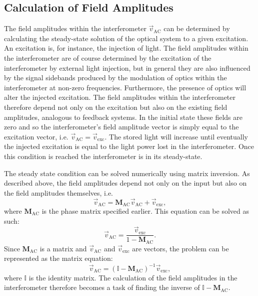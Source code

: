 \subsection{Calculation of Field Amplitudes}
The field amplitudes within the interferometer $\vec{v}_{\text{AC}}$ can be determined by calculating the steady-state solution of the optical system to a given excitation. An excitation is, for instance, the injection of light. The field amplitudes within the interferometer are of course determined by the excitation of the interferometer by external light injection, but in general they are also influenced by the signal sidebands produced by the modulation of optics within the interferometer at non-zero frequencies. Furthermore, the presence of optics will alter the injected excitation. The field amplitudes within the interferometer therefore depend not only on the excitation but also on the existing field amplitudes, analogous to feedback systems. In the initial state these fields are zero and so the interferometer's field amplitude vector is simply equal to the excitation vector, i.e. $\vec{v}_{\text{AC}} = \vec{v}_{\text{exc}}$. The stored light will increase until eventually the injected excitation is equal to the light power lost in the interferometer. Once this condition is reached the interferometer is in its steady-state.

The steady state condition can be solved numerically using matrix inversion. As described above, the field amplitudes depend not only on the input but also on the field amplitudes themselves, i.e.
\begin{equation}
  \vec{v}_{\text{AC}} = \mathbf{M}_{\text{AC}} \vec{v}_{\text{AC}} + \vec{v}_{\text{exc}},
\end{equation}
where $\mathbf{M}_{\text{AC}}$ is the phase matrix specified earlier. This equation can be solved as such:
\begin{equation}
  \vec{v}_{\text{AC}} = \frac{\vec{v}_{\text{exc}}}{1 - \mathbf{M}_{\text{AC}}}.
\end{equation}
Since $\mathbf{M}_{\text{AC}}$ is a matrix and $\vec{v}_{\text{AC}}$ and $\vec{v}_{\text{exc}}$ are vectors, the problem can be represented as the matrix equation:
\begin{equation}
  \vec{v}_{\text{AC}} = \left( \mathbb{I} - \mathbf{M}_{\text{AC}} \right)^{-1} \vec{v}_{\text{exc}},
\end{equation}
where $\mathbb{I}$ is the identity matrix. The calculation of the field amplitudes in the interferometer therefore becomes a task of finding the inverse of $\mathbb{I} - \mathbf{M}_{\text{AC}}$.

